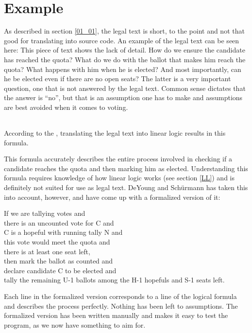 \section{Example}
\label{E}

As described in section \ref{01_01}, the legal text is short, to the point and not that good for translating into source code. An example of the legal text can be seen here:
This piece of text shows the lack of detail. How do we ensure the candidate has reached the quota? What do we do with the ballot that makes him reach the quota? What happens with him when he is elected? And most importantly, can he be elected even if there are no open seats? The latter is a very important question, one that is not answered by the legal text. Common sense dictates that the answer is “no”, but that is an assumption one has to make and assumptions are best avoided when it comes to voting.

 \\
According to the , translating the legal text into linear logic results in this formula.

\begin{texto}
\end{texto}

This formula accurately describes the entire process involved in checking if a candidate reaches the quota and then marking him as elected. Understanding this formula requires knowledge of how linear logic works (see section \ref{LL}) and is definitely not suited for use as legal text. DeYoung and Schürmann has taken this into account, however, and have come up with a formalized version of it:

\begin{texto} 
If we are tallying votes and \\
there is an uncounted vote for C and \\
C is a hopeful with running tally N and \\
this vote would meet the quota and \\
there is at least one seat left, \\
then mark the ballot as counted and \\
declare candidate C to be elected and \\
tally the remaining U-1 ballots among the H-1 hopefuls and S-1 seats left.
\end{texto}

Each line in the formalized version corresponds to a line of the logical formula and describes the process perfectly. Nothing has been left to assumptions. The formalized version has been written manually and makes it easy to test the program, as we now have something to aim for.